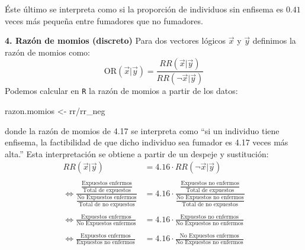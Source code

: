\documentclass[
]{book}
\newenvironment{Shaded}{\begin{snugshade}}{\end{snugshade}}
\newcommand{\NormalTok}[1]{#1}
\newcommand{\OtherTok}[1]{\textcolor[rgb]{0.56,0.35,0.01}{#1}}
\newcommand{\SpecialCharTok}[1]{\textcolor[rgb]{0.00,0.00,0.00}{#1}}
\begin{document}
Éste último se interpreta como si la proporción de individuos sin enfisema es \(0.41\) veces más pequeña entre fumadores que no fumadores.

\textbf{4. Razón de momios (discreto)}
Para dos vectores lógicos \(\vec{x}\) y \(\vec{y}\) definimos la razón de momios como:
\[
\textrm{OR}(\vec{x}|\vec{y}) =\dfrac{RR(\vec{x}|\vec{y})}{RR(\neg\vec{x}|\vec{y})} 
\]
Podemos calcular en \texttt{R} la razón de momios a partir de los datos:

\begin{Shaded}
\begin{Highlighting}[]
\NormalTok{razon.momios }\OtherTok{\textless{}{-}}\NormalTok{ rr}\SpecialCharTok{/}\NormalTok{rr\_neg}
\end{Highlighting}
\end{Shaded}

donde la razón de momios de 4.17 se interpreta como ``si un individuo tiene enfisema, la factibilidad de que dicho individuo sea fumador es 4.17 veces más alta.'' Esta interpretación se obtiene a partir de un despeje y sustitución:
\begin{equation}\nonumber
\begin{aligned}
RR(\vec{x}|\vec{y})  & = 4.16 \cdot RR(\neg\vec{x}|\vec{y}) \\  \\
\Leftrightarrow  \dfrac{\frac{\text{Expuestos enfermos}}{\text{Total de expuestos}}}{\frac{\text{No Expuestos enfermos}}{\text{Total de no expuestos}}} & = 4.16 \cdot \dfrac{\frac{\text{Expuestos no enfermos}}{\text{Total de expuestos}}}{\frac{\text{No Expuestos no enfermos}}{\text{Total de no expuestos}}} \\ \\
\Leftrightarrow \frac{\text{Expuestos enfermos}}{\text{No Expuestos enfermos}} & = 4.16\cdot \frac{\text{Expuestos no enfermos}}{\text{No Expuestos no enfermos}}  \\
\\ \Leftrightarrow  \frac{\text{Expuestos enfermos}}{\text{Expuestos no enfermos}} & = 4.16\cdot \frac{\text{No Expuestos enfermos}}{\text{No Expuestos no enfermos}}
\end{aligned}
\end{equation}
\end{document}
